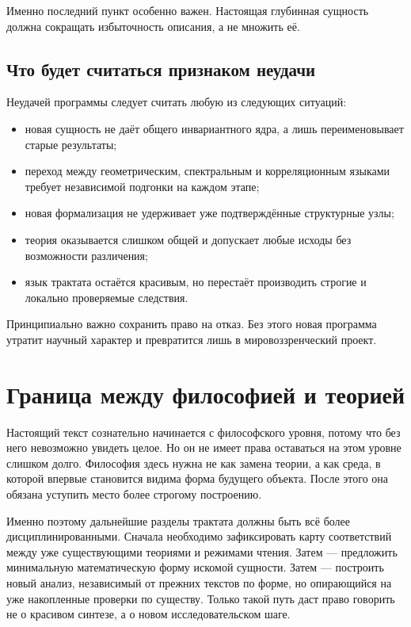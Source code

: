 \documentclass[12pt,a4paper]{article}
\begin{document}
Именно последний пункт особенно важен. Настоящая глубинная сущность должна сокращать избыточность описания, а не множить её.

\subsection{Что будет считаться признаком неудачи}

Неудачей программы следует считать любую из следующих ситуаций:
\begin{itemize}
    \item новая сущность не даёт общего инвариантного ядра, а лишь переименовывает старые результаты;
    \item переход между геометрическим, спектральным и корреляционным языками требует независимой подгонки на каждом этапе;
    \item новая формализация не удерживает уже подтверждённые структурные узлы;
    \item теория оказывается слишком общей и допускает любые исходы без возможности различения;
    \item язык трактата остаётся красивым, но перестаёт производить строгие и локально проверяемые следствия.
\end{itemize}

Принципиально важно сохранить право на отказ. Без этого новая программа утратит научный характер и превратится лишь в мировоззренческий проект.

\section{Граница между философией и теорией}

Настоящий текст сознательно начинается с философского уровня, потому что без него невозможно увидеть целое. Но он не имеет права оставаться на этом уровне слишком долго. Философия здесь нужна не как замена теории, а как среда, в которой впервые становится видима форма будущего объекта. После этого она обязана уступить место более строгому построению.

Именно поэтому дальнейшие разделы трактата должны быть всё более дисциплинированными. Сначала необходимо зафиксировать карту соответствий между уже существующими теориями и режимами чтения. Затем --- предложить минимальную математическую форму искомой сущности. Затем --- построить новый анализ, независимый от прежних текстов по форме, но опирающийся на уже накопленные проверки по существу. Только такой путь даст право говорить не о красивом синтезе, а о новом исследовательском шаге.
\end{document}
